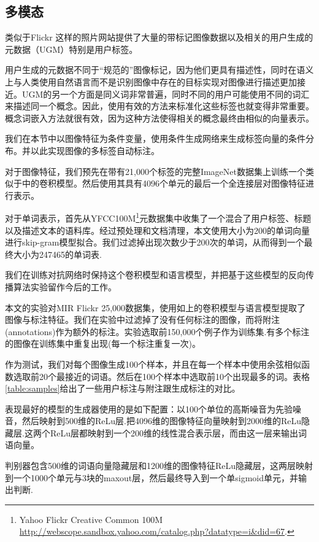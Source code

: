 \documentclass{article} %
\begin{document}
\subsection{多模态}
类似于Flickr 这样的照片网站提供了大量的带标记图像数据以及相关的用户生成的元数据（UGM）特别是用户标签。

用户生成的元数据不同于“规范的”图像标记，因为他们更具有描述性，同时在语义上与人类使用自然语言而不是识别图像中存在的目标实现对图像进行描述更加接近。UGM的另一个方面是同义词非常普遍，同时不同的用户可能使用不同的词汇来描述同一个概念。因此，使用有效的方法来标准化这些标签也就变得非常重要。概念词嵌入方法\cite{mikolov-et-al-iclr2013}就很有效，因为这种方法使得相关的概念最终由相似的向量表示。

我们在本节中以图像特征为条件变量，使用条件生成网络来生成标签向量的条件分布。并以此实现图像的多标签自动标注。

对于图像特征，我们预先在带有21,000个标签的完整ImageNet数据集\cite{RussakovskyFeiFei}上训练一个类似于\cite{Krizhevsky-2012}中的卷积模型。然后使用其具有4096个单元的最后一个全连接层对图像特征进行表示。

对于单词表示，首先从YFCC100M\footnote{Yahoo Flickr Creative Common 100M \url{http://webscope.sandbox.yahoo.com/catalog.php?datatype=i&did=67}.}元数据集中收集了一个混合了用户标签、标题以及描述文本的语料库。经过预处理和文档清理，本文使用大小为200的单词向量进行skip-gram模型拟合。我们过滤掉出现次数少于200次的单词，从而得到一个最终大小为247465的单词表.

我们在训练对抗网络时保持这个卷积模型和语言模型，并把基于这些模型的反向传播算法实验留作今后的工作。

本文的实验对MIR Flickr 25,000数据集\cite{huiskes08}，使用如上的卷积模型与语言模型提取了图像与标注特征。我们在实验中过滤掉了没有任何标注的图像，而将附注(annotations)作为额外的标注。实验选取前150,000个例子作为训练集.有多个标注的图像在训练集中重复出现(每一个标注重复一次)。

作为测试，我们对每个图像生成100个样本，并且在每一个样本中使用余弦相似函数选取前20个最接近的词语。然后在100个样本中选取前10个出现最多的词。表格\ref{table:samples}给出了一些用户标注与附注跟生成标注的对比。

表现最好的模型的生成器使用的是如下配置：以100个单位的高斯噪音为先验噪音，然后映射到500维的ReLu层.把4096维的图像特征向量映射到2000维的ReLu隐藏层.这两个ReLu层都映射到一个200维的线性混合表示层，而由这一层来输出词语向量。

判别器包含500维的词语向量隐藏层和1200维的图像特征ReLu隐藏层，这两层映射到一个1000个单元与3块的maxout层，然后最终导入到一个单sigmoid单元，并输出判断.
\end{document}
